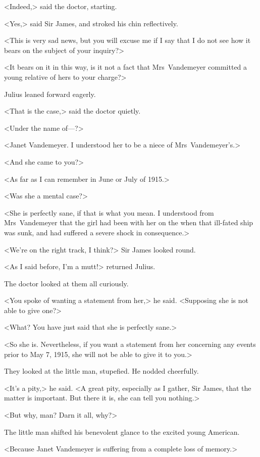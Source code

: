 <Indeed,> said the doctor, starting.

<Yes,> said Sir James, and stroked his chin reflectively.

<This is very sad news, but you will excuse me if I say that I do not see how it bears on the subject of your inquiry?>

<It bears on it in this way, is it not a fact that Mrs~Vandemeyer committed a young relative of hers to your charge?>

Julius leaned forward eagerly.

<That is the case,> said the doctor quietly.

<Under the name of—?>

<Janet Vandemeyer. I understood her to be a niece of Mrs~Vandemeyer's.>

<And she came to you?>

<As far as I can remember in June or July of 1915.>

<Was she a mental case?>

<She is perfectly sane, if that is what you mean. I understood from Mrs~Vandemeyer that the girl had been with her on the  when that ill-fated ship was sunk, and had suffered a severe shock in consequence.>

<We're on the right track, I think?> Sir James looked round.

<As I said before, I'm a mutt!> returned Julius.

The doctor looked at them all curiously.

<You spoke of wanting a statement from her,> he said. <Supposing she is not able to give one?>

<What? You have just said that she is perfectly sane.>

<So she is. Nevertheless, if you want a statement from her concerning any events prior to May 7, 1915, she will not be able to give it to you.>

They looked at the little man, stupefied. He nodded cheerfully.

<It's a pity,> he said. <A great pity, especially as I gather, Sir James, that the matter is important. But there it is, she can tell you nothing.>

<But why, man? Darn it all, why?>

The little man shifted his benevolent glance to the excited young American.

<Because Janet Vandemeyer is suffering from a complete loss of memory.>

